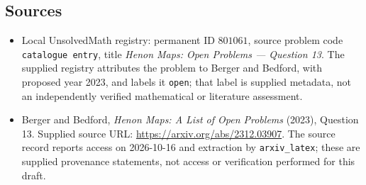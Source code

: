 \documentclass[11pt]{article}
\begin{document}
\subsection{Sources}
\begin{itemize}
\item Local UnsolvedMath registry: permanent ID \(801061\), source problem code \texttt{catalogue entry}, title \emph{Henon Maps: Open Problems --- Question 13}. The supplied registry attributes the problem to Berger and Bedford, with proposed year 2023, and labels it \texttt{open}; that label is supplied metadata, not an independently verified mathematical or literature assessment.
\item Berger and Bedford, \emph{Henon Maps: A List of Open Problems} (2023), Question 13. Supplied source URL: \url{https://arxiv.org/abs/2312.03907}. The source record reports access on 2026-10-16 and extraction by \texttt{arxiv\_latex}; these are supplied provenance statements, not access or verification performed for this draft.
\end{itemize}
\end{document}
